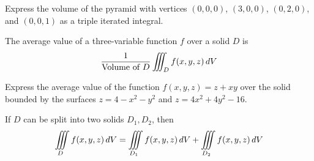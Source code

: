 \documentclass[letterpaper, twoside, 12pt]{book}
\begin{document}
          \begin{problem}
            Express the volume of the pyramid with vertices
            $(0,0,0)$, $(3,0,0)$, $(0,2,0)$, and $(0,0,1)$
            as a triple iterated integral.
          \end{problem}

          \begin{solution}

          \end{solution}

          \begin{contributors}

          \end{contributors}

\begin{definition}
  The average value of a three-variable function $f$ over a solid $D$ is
  \[
    \frac{1}{\text{Volume of }D}\iiint_D f(x,y,z)\,d{V}
  \]
\end{definition}

          \begin{problem}
            Express the average value of the function $f(x,y,z)=z+xy$
            over the solid bounded by the surfaces
            $z=4-x^2-y^2$ and $z=4x^2+4y^2-16$.
          \end{problem}

          \begin{solution}

          \end{solution}

          \begin{contributors}

          \end{contributors}

\begin{theorem}
  If $D$ can be split into two solids $D_1,D_2$, then
  \[
    \iiint\limits_D f(x,y,z)\,d{V}
      =
    \iiint\limits_{D_1} f(x,y,z)\,d{V} + \iiint\limits_{D_2} f(x,y,z)\,d{V}
  \]
\end{theorem}
\end{document}
